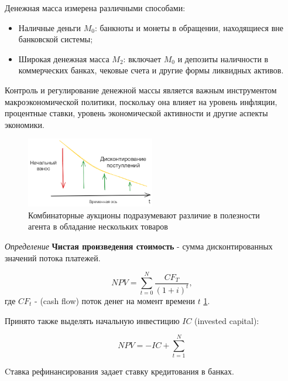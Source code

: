 Денежная масса измерена различными способами:
\begin{itemize}
    \item  Наличные деньги $M_0$: банкноты и монеты в обращении, находящиеся вне банковской системы;
    \item Широкая денежная масса $M_2$: включает $M_0$ и депозиты наличности в коммерческих банках, чековые счета и другие формы ликвидных активов.
\end{itemize}

Контроль и регулирование денежной массы является важным инструментом макроэкономической политики, поскольку она влияет на уровень инфляции, процентные ставки, уровень экономической активности и другие аспекты экономики.

\begin{figure}[h]
    \centering
    \includegraphics[width=0.5\textwidth]{assets/overview/cash_flow.excalidraw.png}
    \caption{Комбинаторные аукционы подразумевают различие в полезности агента в обладание нескольких товаров}
    \label{npv}
\end{figure}


\textit{Определение} \textbf{Чистая произведения стоимость} - сумма дисконтированных значений потока платежей.

$$
    NPV = \sum_{t=0}^N \frac{CF_T}{(1+i)^t},
$$
где $CF_t$  - (cash flow) поток денег на момент времени $t$ \ref{npv}.

Принято также выделять начальную инвестицию $IC$ (invested capital):

$$
    NPV = -IC + \sum_{t=1}^N 
$$

Cтавка рефинансирования задает ставку кредитования в банках. 
